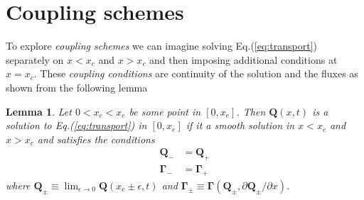 \documentclass[11pt, reqno]{amsart}
\newcommand{\eqr}[1]{Eq.\thinspace(#1)}
\newcommand{\pfracb}[2]{\partial #1/\partial #2}
\newcommand{\mvec}[1]{\mathbf{#1}}
\newcommand{\gvec}[1]{\boldsymbol{#1}}
\newtheorem{lem}{Lemma}
\theoremstyle{definition}
\begin{document}
\section{Coupling schemes}

To explore \emph{coupling schemes} we can imagine solving
\eqr{\ref{eq:transport}} separately on $x<x_c$ and $x>x_c$ and then
imposing additional conditions at $x=x_c$. These \emph{coupling
  conditions} are continuity of the solution and the fluxes as shown
from the following lemma
\begin{lem}
  \label{lem:couple-conditions}
  Let $0<x_c<x_e$ be some point in $[0,x_e]$. Then $\mvec{Q}(x,t)$ is
  a solution to \eqr{\ref{eq:transport}} in $[0,x_e]$ if it a smooth
  solution in $x<x_c$ and $x>x_c$ and satisfies the conditions
  \begin{align}
    \mvec{Q}_- &= \mvec{Q}_+ \\
    \mvec{\Gamma}_- &= \mvec{\Gamma}_+
  \end{align}
  where $\mvec{Q}_\pm \equiv \lim_{\epsilon\rightarrow
    0}\mvec{Q}(x_c\pm\epsilon,t)$ and $\gvec{\Gamma}_\pm \equiv
  \gvec{\Gamma}(\mvec{Q}_\pm,\pfracb{\mvec{Q}_\pm}{x})$.
\end{lem}
\end{document}
